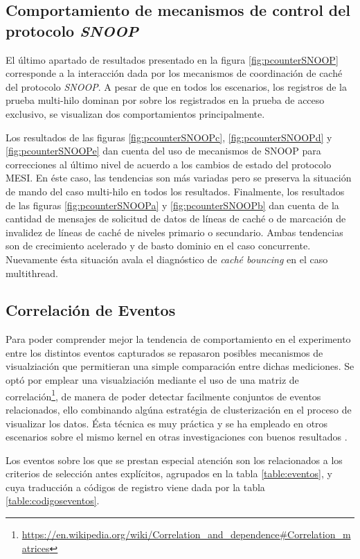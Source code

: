 \subsection{Comportamiento de mecanismos de control del protocolo \emph{SNOOP}}
El último apartado de resultados presentado en la figura \ref{fig:pcounterSNOOP} corresponde a la interacción dada por los mecanismos de coordinación de caché del protocolo \emph{SNOOP}. A pesar de que en todos los escenarios, los registros de la prueba multi-hilo dominan por sobre los registrados en la prueba de acceso exclusivo, se visualizan dos comportamientos principalmente.

Los resultados de las figuras \ref{fig:pcounterSNOOPc}, \ref{fig:pcounterSNOOPd} y \ref{fig:pcounterSNOOPe} dan cuenta del uso de mecanismos de SNOOP para correcciones al último nivel de acuerdo a los cambios de estado del protocolo MESI. En éste caso, las tendencias son más variadas pero se preserva la situación de mando del caso multi-hilo en todos los resultados. Finalmente, los resultados de las figuras \ref{fig:pcounterSNOOPa} y \ref{fig:pcounterSNOOPb} dan cuenta de la cantidad de mensajes de solicitud de datos de líneas de caché o de marcación de invalidez de líneas de caché de niveles primario o secundario. Ambas tendencias son de crecimiento acelerado y de basto dominio en el caso concurrente. Nuevamente ésta situación avala el diagnóstico de \emph{caché bouncing} en el caso multithread.

\subsection{Correlación de Eventos}
Para poder comprender mejor la tendencia de comportamiento en el experimento entre los distintos eventos capturados se repasaron posibles mecanismos de visualziación que permitieran una simple comparación entre dichas mediciones. Se optó por emplear una visualziación mediante el uso de una matriz de correlación\footnote{\url{https://en.wikipedia.org/wiki/Correlation_and_dependence#Correlation_matrices}}, de manera de poder detectar facilmente conjuntos de eventos relacionados, ello combinando algúna estratégia de clusterización en el proceso de visualizar los datos. Ésta técnica es muy práctica y se ha empleado en otros escenarios sobre el mismo kernel en otras investigaciones con buenos resultados \cite{paper:clusteringKernel}.

Los eventos sobre los que se prestan especial atención son los relacionados a los criterios de selección antes explícitos, agrupados en la tabla \ref{table:eventos}, y cuya traducción a códigos de registro viene dada por la tabla \ref{table:codigoseventos}.

